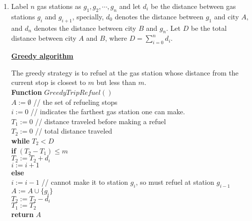 \documentclass[11pt]{article}
\begin{document}
\begin{enumerate}
\item %
Label $n$ gas stations as $g_1,g_2,\cdots,g_n$ and let $d_i$ be the
distance between gas stations $g_i$ and $g_{i+1}$, specially, $d_0$
denotes the distance between $g_1$ and city $A$, and $d_{n}$ denotes
the distance between city $B$ and $g_n$. Let $D$ be the total distance
between city $A$ and $B$, where $D=\sum_{i=0}^{n} d_i$.

\underline{\textbf{Greedy algorithm}}

The greedy strategy is to refuel at the gas station whose distance
from the current stop is closest to $m$ but less than $m$.\\

\textbf{Function} $GreedyTripRefuel()$\\
\-\hspace{3em} $A := \emptyset$ // the set of refueling stops\\
\-\hspace{3em} $i := 0$ // indicates the farthest gas station one can
make.\\
\-\hspace{3em} $T_1 := 0$ // distance traveled before making a
refuel\\
\-\hspace{3em} $T_2 := 0$ // total distance traveled \\
\-\hspace{3em} \textbf{while} $T_2 < D$ \\
\-\hspace{5em} \textbf{if} $(T_2 - T_1) \leq m$ \\
\-\hspace{7em} $T_2 := T_2 + d_i$ \\
\-\hspace{7em} $i := i + 1$ \\
\-\hspace{5em} \textbf{else} \\
\-\hspace{7em} $i := i - 1$ // cannot make it to station $g_i$, so
must refuel at station $g_{i-1}$\\ 
\-\hspace{7em} $A := A \cup \{g_i\}$ \\
\-\hspace{7em} $T_2 := T_2 - d_i$ \\
\-\hspace{7em} $T_1 := T_2$ \\
\-\hspace{3em} \textbf{return} $A$ \\


\end{enumerate}
\end{document}
